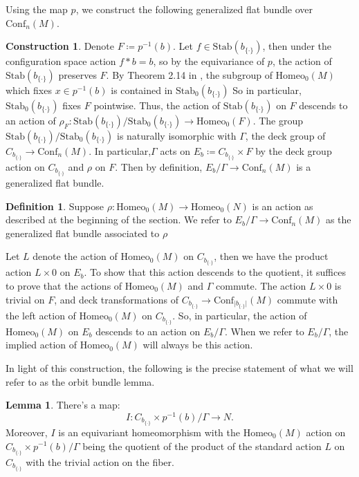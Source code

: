 \documentclass[10pt, oneside]{article}
\newcommand{\homeo}[1][S^1]{\text{Homeo}_0(#1)}
\newcommand{\conf}[2][S^1]{\text{Conf}_{#2}(#1)}
\newcommand{\set}{{\{\cdot\}}}
\newcommand{\stab}[1]{\text{Stab}(#1)}
\newcommand{\pstab}[1]{\text{Stab}_0(#1)}
\newcommand{\maxcov}{C_{b_\set}}
\theoremstyle{definition}
\newtheorem{defn}{Definition}[section]
\newtheorem*{construction*}{Construction}
\newtheorem{lem}{Lemma}[section]
\theoremstyle{definition}
\begin{document}
Using the map $p$, we construct the following generalized flat bundle over $\conf[M]{n}$.

\begin{construction*}\label{const:orbit-bundle}
    Denote $F\coloneqq p^{-1}(b)$. 
    Let $f\in\stab{b_\set}$, then under the configuration space action $f*b=b$, so by the equivariance of $p$, the action of $\stab{b_\set}$ preserves $F$.
    By Theorem 2.14 in \cite{chen:StructureTheorems}, the subgroup of $\homeo[M]$ which fixes $x\in p^{-1}(b)$ is contained in $\pstab{b_\set}$
    So in particular, $\pstab{b_\set}$ fixes $F$ pointwise. 
    Thus, the action of $\stab{b_\set}$ on $F$ descends to an action of $\rho_F:\stab{b_\set}/\pstab{b_\set}\to \homeo[F]$. The group $\stab{b_\set}/\pstab{b_\set}$ is naturally isomorphic with $\Gamma$, the deck group of $C_{b_\set}\to \conf[M]{n}$. 
    In particular,$\Gamma$ acts on $E_b \coloneqq\maxcov\times F$ by the deck group action on $\maxcov$ and $\rho$ on $F$.
    Then by definition, $E_b/\Gamma\to\conf[M]{n}$ is a generalized flat bundle.

    \begin{defn}
        Suppose $\rho:\homeo[M]\to\homeo[N]$ is an action as described at the beginning of the section. We refer to $E_b/\Gamma\to\conf[M]{n}$ as the generalized flat bundle associated to $\rho$
    \end{defn}

    Let $L$ denote the action of $\homeo[M]$ on $\maxcov$, then we have the product action $L\times 0$ on $E_b$. To show that this action descends to the quotient, it suffices to prove that the actions of $\homeo[M]$ and $\Gamma$ commute. The action $L\times 0$ is trivial on $F$, and deck transformations of $\maxcov\to \conf[M]{\lvert b_{\set}\rvert}$ commute with the left action of $\homeo[M]$ on $\maxcov$. So, in particular, the action of $\homeo[M]$ on $E_b$ descends to an action on $E_b/\Gamma$. When we refer to $E_b/\Gamma$, the implied action of $\homeo[M]$ will always be this action.
\end{construction*}

In light of this construction, the following is the precise statement of what we will refer to as the orbit bundle lemma.

\begin{lem}\label{lem:orbit-bundle}
    There's a map: $$I: \maxcov \times p^{-1}(b)/ \Gamma \to N.$$ 
    Moreover, $I$ is an equivariant homeomorphism 
    with the $\homeo[M]$ action on $\maxcov \times p^{-1}(b) / \Gamma$ being the quotient of the product of the standard action $L$ on $\maxcov$ 
    with the trivial action on the fiber.
\end{lem}
\end{document}
